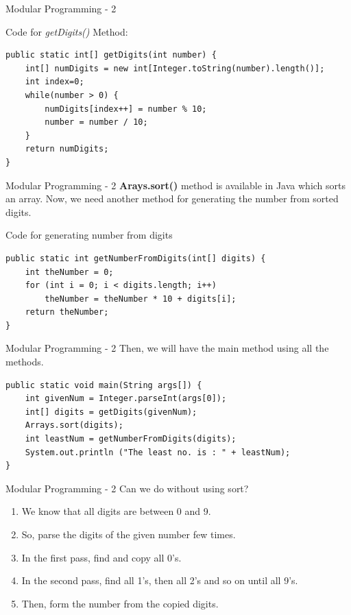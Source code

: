 \documentclass[14pt]{beamer}
\begin{document}
\begin{frame}[fragile]{Modular Programming - 2}
\begin{block}{Code for \emph{getDigits()} Method:}
\begin{lstlisting}[numbers=none]
public static int[] getDigits(int number) {
    int[] numDigits = new int[Integer.toString(number).length()];
    int index=0;
    while(number > 0) {
        numDigits[index++] = number % 10;
        number = number / 10;
    }
    return numDigits;
}
\end{lstlisting}
\end{block}
\end{frame}

\begin{frame}[fragile]{Modular Programming - 2}
\textbf{Arays.sort()} method is available in Java which sorts an array. Now, we need another method for generating the number from sorted digits.
\begin{block}{Code for generating number from digits}
\begin{lstlisting}[numbers=none]
public static int getNumberFromDigits(int[] digits) {
    int theNumber = 0;
    for (int i = 0; i < digits.length; i++)
        theNumber = theNumber * 10 + digits[i];
    return theNumber;
}
\end{lstlisting}
\end{block}
\end{frame}

\begin{frame}[fragile]{Modular Programming - 2}
Then, we will have the main method using all the methods.
\begin{lstlisting}[numbers=none]
public static void main(String args[]) {
    int givenNum = Integer.parseInt(args[0]);
    int[] digits = getDigits(givenNum);
    Arrays.sort(digits);
    int leastNum = getNumberFromDigits(digits);
    System.out.println ("The least no. is : " + leastNum);
}
\end{lstlisting}
\end{frame}

\begin{frame}{Modular Programming - 2}
Can we do without using sort? 
\begin{enumerate}
\item We know that all digits are between 0 and 9. 
\item So, parse the digits of the given number few times. 
\item In the first pass, find and copy all 0's. 
\item In the second pass, find all 1's, then all 2's and so on until all 9's. 
\item Then, form the number from the copied digits.
\end{enumerate}
\end{frame}
\end{document}
